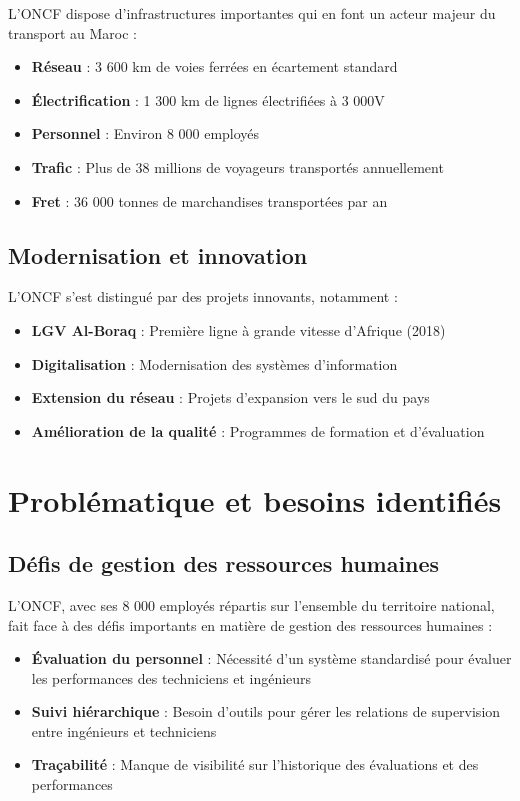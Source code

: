 L'ONCF dispose d'infrastructures importantes qui en font un acteur majeur du transport au Maroc :
\begin{itemize}
    \item \textbf{Réseau} : 3 600 km de voies ferrées en écartement standard
    \item \textbf{Électrification} : 1 300 km de lignes électrifiées à 3 000V
    \item \textbf{Personnel} : Environ 8 000 employés
    \item \textbf{Trafic} : Plus de 38 millions de voyageurs transportés annuellement
    \item \textbf{Fret} : 36 000 tonnes de marchandises transportées par an
\end{itemize}

\subsection{Modernisation et innovation}

L'ONCF s'est distingué par des projets innovants, notamment :
\begin{itemize}
    \item \textbf{LGV Al-Boraq} : Première ligne à grande vitesse d'Afrique (2018)
    \item \textbf{Digitalisation} : Modernisation des systèmes d'information
    \item \textbf{Extension du réseau} : Projets d'expansion vers le sud du pays
    \item \textbf{Amélioration de la qualité} : Programmes de formation et d'évaluation
\end{itemize}

\section{Problématique et besoins identifiés}

\subsection{Défis de gestion des ressources humaines}

L'ONCF, avec ses 8 000 employés répartis sur l'ensemble du territoire national, fait face à des défis importants en matière de gestion des ressources humaines :

\begin{itemize}
    \item \textbf{Évaluation du personnel} : Nécessité d'un système standardisé pour évaluer les performances des techniciens et ingénieurs
    \item \textbf{Suivi hiérarchique} : Besoin d'outils pour gérer les relations de supervision entre ingénieurs et techniciens
    \item \textbf{Traçabilité} : Manque de visibilité sur l'historique des évaluations et des performances
\end{itemize}

